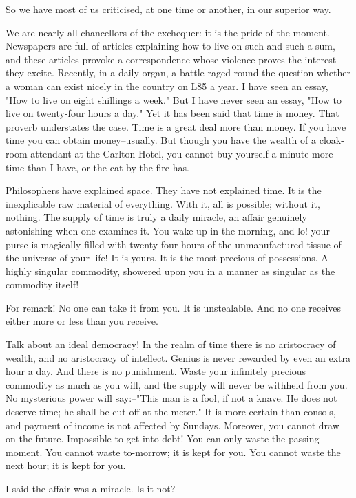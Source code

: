 So we have most of us criticised, at one time or another, in our
superior way.

We are nearly all chancellors of the exchequer:  it is the pride of the
moment.  Newspapers are full of articles explaining how to live on
such-and-such a sum, and these articles provoke a correspondence whose
violence proves the interest they excite.  Recently, in a daily organ,
a battle raged round the question whether a woman can exist nicely in
the country on L85 a year.  I have seen an essay, "How to live on eight
shillings a week."  But I have never seen an essay, "How to live on
twenty-four hours a day."  Yet it has been said that time is money.
That proverb understates the case.  Time is a great deal more than
money.  If you have time you can obtain money--usually.  But though you
have the wealth of a cloak-room attendant at the Carlton Hotel, you
cannot buy yourself a minute more time than I have, or the cat by the
fire has.


Philosophers have explained space.  They have not explained time. It is
the inexplicable raw material of everything.  With it, all is possible;
without it, nothing.  The supply of time is truly a daily miracle, an
affair genuinely astonishing when one examines it.  You wake up in the
morning, and lo! your purse is magically filled with twenty-four hours
of the unmanufactured tissue of the universe of your life!  It is
yours.  It is the most precious of possessions.  A highly singular
commodity, showered upon you in a manner as singular as the commodity
itself!

For remark!  No one can take it from you.  It is unstealable.  And no
one receives either more or less than you receive.

Talk about an ideal democracy!  In the realm of time there is no
aristocracy of wealth, and no aristocracy of intellect.  Genius is
never rewarded by even an extra hour a day.  And there is no
punishment.  Waste your infinitely precious commodity as much as you
will, and the supply will never be withheld from you.  No mysterious
power will say:--"This man is a fool, if not a knave.  He does not
deserve time; he shall be cut off at the meter." It is more certain
than consols, and payment of income is not affected by Sundays.
Moreover, you cannot draw on the future.  Impossible to get into debt!
You can only waste the passing moment.  You cannot waste to-morrow; it
is kept for you.  You cannot waste the next hour; it is kept for you.

I said the affair was a miracle.  Is it not?

